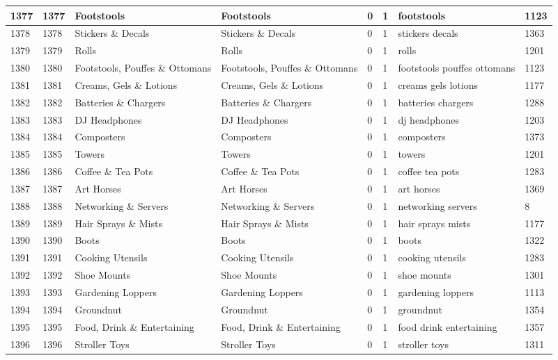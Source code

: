 \begin{longtable}{|l|l|l|l|l|l|l|l|}
1377 & 1377 & Footstools & Footstools & 0 & 1 & footstools & 1123 \\ \hline 
1378 & 1378 & Stickers \& Decals & Stickers \& Decals & 0 & 1 & stickers decals & 1363 \\ \hline 
1379 & 1379 & Rolls & Rolls & 0 & 1 & rolls & 1201 \\ \hline 
1380 & 1380 & Footstools, Pouffes \& Ottomans & Footstools, Pouffes \& Ottomans & 0 & 1 & footstools pouffes ottomans & 1123 \\ \hline 
1381 & 1381 & Creams, Gels \& Lotions & Creams, Gels \& Lotions & 0 & 1 & creams gels lotions & 1177 \\ \hline 
1382 & 1382 & Batteries \& Chargers & Batteries \& Chargers & 0 & 1 & batteries chargers & 1288 \\ \hline 
1383 & 1383 & DJ Headphones & DJ Headphones & 0 & 1 & dj headphones & 1203 \\ \hline 
1384 & 1384 & Composters & Composters & 0 & 1 & composters & 1373 \\ \hline 
1385 & 1385 & Towers & Towers & 0 & 1 & towers & 1201 \\ \hline 
1386 & 1386 & Coffee \& Tea Pots & Coffee \& Tea Pots & 0 & 1 & coffee tea pots & 1283 \\ \hline 
1387 & 1387 & Art Horses & Art Horses & 0 & 1 & art horses & 1369 \\ \hline 
1388 & 1388 & Networking \& Servers & Networking \& Servers & 0 & 1 & networking servers & 8 \\ \hline 
1389 & 1389 & Hair Sprays \& Mists & Hair Sprays \& Mists & 0 & 1 & hair sprays mists & 1177 \\ \hline 
1390 & 1390 & Boots & Boots & 0 & 1 & boots & 1322 \\ \hline 
1391 & 1391 & Cooking Utensils & Cooking Utensils & 0 & 1 & cooking utensils & 1283 \\ \hline 
1392 & 1392 & Shoe Mounts & Shoe Mounts & 0 & 1 & shoe mounts & 1301 \\ \hline 
1393 & 1393 & Gardening Loppers & Gardening Loppers & 0 & 1 & gardening loppers & 1113 \\ \hline 
1394 & 1394 & Groundnut & Groundnut & 0 & 1 & groundnut & 1354 \\ \hline 
1395 & 1395 & Food, Drink \& Entertaining & Food, Drink \& Entertaining & 0 & 1 & food drink entertaining & 1357 \\ \hline 
1396 & 1396 & Stroller Toys & Stroller Toys & 0 & 1 & stroller toys & 1311 \\ \hline 

\end{longtable}
